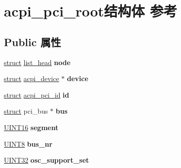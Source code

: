 \hypertarget{structacpi__pci__root}{}\section{acpi\+\_\+pci\+\_\+root结构体 参考}
\label{structacpi__pci__root}
\subsection*{Public 属性}
\begin{DoxyCompactItemize}
\item 
\mbox{\label{structacpi__pci__root_ace26babd72a44fb401ed7b2a89802fc3}} 
\hyperlink{interfacestruct}{struct} \hyperlink{structlist__head}{list\+\_\+head} {\bfseries node}
\item 
\mbox{\label{structacpi__pci__root_a54b9f149e95306a308b31f015511a1cb}} 
\hyperlink{interfacestruct}{struct} \hyperlink{structacpi__device}{acpi\+\_\+device} $\ast$ {\bfseries device}
\item 
\mbox{\label{structacpi__pci__root_af87231f7110fc9091dd9ab096b70a20f}} 
\hyperlink{interfacestruct}{struct} \hyperlink{structacpi__pci__id}{acpi\+\_\+pci\+\_\+id} {\bfseries id}
\item 
\mbox{\label{structacpi__pci__root_a157ad8eb22f79b944aadece2fdef8d7c}} 
\hyperlink{interfacestruct}{struct} pci\+\_\+bus $\ast$ {\bfseries bus}
\item 
\mbox{\label{structacpi__pci__root_aaace9c3320e417f097ab93f07314b05c}} 
\hyperlink{_processor_bind_8h_a09f1a1fb2293e33483cc8d44aefb1eb1}{U\+I\+N\+T16} {\bfseries segment}
\item 
\mbox{\label{structacpi__pci__root_abb529d3661fc48c490e99a61f259ac96}} 
\hyperlink{_processor_bind_8h_ab27e9918b538ce9d8ca692479b375b6a}{U\+I\+N\+T8} {\bfseries bus\+\_\+nr}
\item 
\mbox{\label{structacpi__pci__root_abfe0399422a38a98be350dab4330aa16}} 
\hyperlink{_processor_bind_8h_ae1e6edbbc26d6fbc71a90190d0266018}{U\+I\+N\+T32} {\bfseries osc\+\_\+support\+\_\+set}

\end{DoxyCompactItemize}
